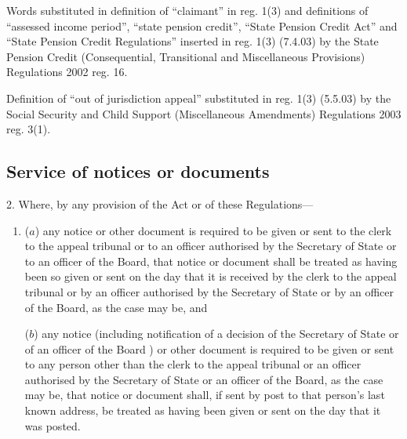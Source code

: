 \documentclass[12pt,a4paper]{article}
\begin{document}
{Words substituted in definition of ``claimant'' in reg. 1(3) and definitions of ``assessed income period'', ``state pension credit'', ``State Pension Credit Act'' and ``State Pension Credit Regulations'' inserted in reg. 1(3) (7.4.03) by the State Pension Credit (Consequential, Transitional and Miscellaneous Provisions) Regulations 2002 reg. 16.

Definition of ``out of jurisdiction appeal'' substituted in reg. 1(3) (5.5.03) by the Social Security and Child Support (Miscellaneous Amendments) Regulations 2003 reg. 3(1).
}

\subsection[2. Service of notices or documents]{Service of notices or documents}

2.  Where, by any provision of the Act%
%
or of these Regulations—
\begin{enumerate}\item[]
($a$) any notice or other document is required to be given or sent to the clerk to the appeal tribunal or to an officer authorised by the Secretary of State
or to an officer of the Board,  %
that notice or document shall be treated as having been so given or sent on the day that it is received by the clerk to the appeal tribunal or by an officer authorised by the Secretary of State
or by an officer of the Board,  %
as the case may be, and

($b$) any notice (including notification of a decision of the Secretary of State
or of an officer of the Board%
) or other document is required to be given or sent to any person other than the clerk to the appeal tribunal 
or an officer  %
authorised by the Secretary of State
or an officer of the Board,  %
as the case may be, that notice or document shall, if sent by post to that person’s last known address, be treated as having been given or sent on the day that it was posted.
\end{enumerate}

\end{document}
